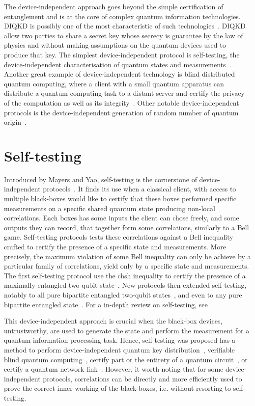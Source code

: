 The device-independent approach goes beyond the simple certification of entanglement and is at the core of complex quantum information technologies.
\acrfull{DIQKD} is possibly one of the most characteristic of such technologies~\cite{Pironio2009,Nadlinger2022}.
\acrshort{DIQKD} allow two parties to share a secret key whose secrecy is guarantee by the law of physics and without making assumptions on the quantum devices used to produce that key.
The simplest device-independent protocol is self-testing, the device-independent characterisation of quantum states and measurements~\cite{Supic2019}.
Another great example of device-independent technology is blind distributed quantum computing, where a client with a small quantum apparatus can distribute a quantum computing task to a distant server and certify the privacy of the computation as well as its integrity~\cite{Fitzsimons2017}.
Other notable device-independent protocols is the device-independent generation of random number of quantum origin~\cite{Liu2018}.

\section{Self-testing}

Introduced by Mayers and Yao, self-testing is the cornerstone of device-independent protocols~\cite{Mayers2004}.
It finds its use when a classical client, with access to multiple black-boxes would like to certify that these boxes performed specific measurements on a specific shared quantum state producing non-local correlations.
Each boxes has some inputs the client can chose freely, and some outputs they can record, that together form some correlations, similarly to a Bell game.
Self-testing protocols tests these correlations against a Bell inequality crafted to certify the presence of a specific state and measurements.
More precisely, the maximum violation of some Bell inequality can only be achieve by a particular family of correlations, yield only by a specific state and measurements.
The first self-testing protocol use the \acrshort{chsh} inequality to certify the presence of a maximally entangled two-qubit state~\cite{Mayers2004}. 
New protocols then extended self-testing, notably to all pure bipartite entangled two-qubit states~\cite{Yang2013,Bamps2015}, and even to any pure bipartite entangled state~\cite{Coladangelo2017}. 
For a in-depth review on self-testing, see \cite{Supic2019}.

\medbreak

This device-independent approach is crucial when the black-box devices, untrustworthy, are used to generate the state and perform the measurement for a quantum information processing task.
Hence, self-testing was proposed has a method to perform device-independent quantum key distribution~\cite{Mayers2004}, verifiable blind quantum computing~\cite{Gheorghiu2015,Gheorghiu2017}, certify part or the entirety of a quantum circuit~\cite{Magniez2006,Sekatski2018}, or certify a quantum network link~\cite{Bancal2021}.
However, it worth noting that for some device-independent protocols, correlations can be directly and more efficiently used to prove the correct inner working of the black-boxes, i.e. without resorting to self-testing.

